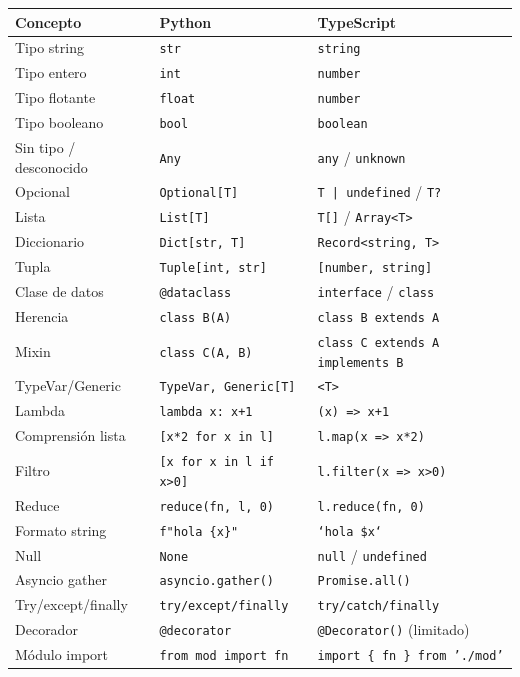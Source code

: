 \documentclass[11pt,a4paper]{article}
\begin{document}
\begin{center}
\begin{tabular}{p{4cm} p{4.5cm} p{5cm}}
\toprule
\textbf{Concepto} & \textbf{Python} & \textbf{TypeScript} \\
\midrule
Tipo string & \texttt{str} & \texttt{string} \\
Tipo entero & \texttt{int} & \texttt{number} \\
Tipo flotante & \texttt{float} & \texttt{number} \\
Tipo booleano & \texttt{bool} & \texttt{boolean} \\
Sin tipo / desconocido & \texttt{Any} & \texttt{any} / \texttt{unknown} \\
Opcional & \texttt{Optional[T]} & \texttt{T | undefined} / \texttt{T?} \\
Lista & \texttt{List[T]} & \texttt{T[]} / \texttt{Array<T>} \\
Diccionario & \texttt{Dict[str, T]} & \texttt{Record<string, T>} \\
Tupla & \texttt{Tuple[int, str]} & \texttt{[number, string]} \\
Clase de datos & \texttt{@dataclass} & \texttt{interface} / \texttt{class} \\
Herencia & \texttt{class B(A)} & \texttt{class B extends A} \\
Mixin & \texttt{class C(A, B)} & \texttt{class C extends A implements B} \\
TypeVar/Generic & \texttt{TypeVar, Generic[T]} & \texttt{<T>} \\
Lambda & \texttt{lambda x: x+1} & \texttt{(x) => x+1} \\
Comprensión lista & \texttt{[x*2 for x in l]} & \texttt{l.map(x => x*2)} \\
Filtro & \texttt{[x for x in l if x>0]} & \texttt{l.filter(x => x>0)} \\
Reduce & \texttt{reduce(fn, l, 0)} & \texttt{l.reduce(fn, 0)} \\
Formato string & \texttt{f"hola \{x\}"} & \texttt{`hola \${x}`} \\
Null & \texttt{None} & \texttt{null} / \texttt{undefined} \\
Asyncio gather & \texttt{asyncio.gather()} & \texttt{Promise.all()} \\
Try/except/finally & \texttt{try/except/finally} & \texttt{try/catch/finally} \\
Decorador & \texttt{@decorator} & \texttt{@Decorator()} (limitado) \\
Módulo import & \texttt{from mod import fn} & \texttt{import \{ fn \} from './mod'} \\
\bottomrule
\end{tabular}
\end{center}
\end{document}
